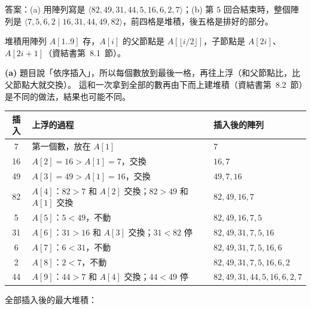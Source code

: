 \begin{pastsoln}
答案：(a) 用陣列寫是 $\langle 82, 49, 31, 44, 5, 16, 6, 2, 7\rangle$；(b) 第 $5$ 回合結束時，整個陣列是
$\langle 7, 5, 6, 2 \mid 16, 31, 44, 49, 82\rangle$，前四格是堆積，後五格是排好的部分。

堆積用陣列 $A[1..9]$ 存，$A[i]$ 的父節點是 $A[\lfloor i/2 \rfloor]$，子節點是 $A[2i]$、
$A[2i+1]$（資結書第~8.1~節）。

\textbf{(a)} 題目說「依序插入」，所以每個數放到最後一格，再往上浮（和父節點比，比父節點大就交換）。
這和一次拿到全部的數再由下而上建堆積（資結書第~8.2~節）是不同的做法，結果也可能不同。

\begin{center}
\begin{tabular}{cll}
\toprule
插入 & 上浮的過程 & 插入後的陣列 \\
\midrule
7 & 第一個數，放在 $A[1]$ & $7$ \\
16 & $A[2] = 16 > A[1] = 7$，交換 & $16, 7$ \\
49 & $A[3] = 49 > A[1] = 16$，交換 & $49, 7, 16$ \\
82 & $A[4]$：$82 > 7$ 和 $A[2]$ 交換；$82 > 49$ 和 $A[1]$ 交換 & $82, 49, 16, 7$ \\
5 & $A[5]$：$5 < 49$，不動 & $82, 49, 16, 7, 5$ \\
31 & $A[6]$：$31 > 16$ 和 $A[3]$ 交換；$31 < 82$ 停 & $82, 49, 31, 7, 5, 16$ \\
6 & $A[7]$：$6 < 31$，不動 & $82, 49, 31, 7, 5, 16, 6$ \\
2 & $A[8]$：$2 < 7$，不動 & $82, 49, 31, 7, 5, 16, 6, 2$ \\
44 & $A[9]$：$44 > 7$ 和 $A[4]$ 交換；$44 < 49$ 停 & $82, 49, 31, 44, 5, 16, 6, 2, 7$ \\
\bottomrule
\end{tabular}
\end{center}

全部插入後的最大堆積：

\begin{center}
\end{center}


\end{pastsoln}

